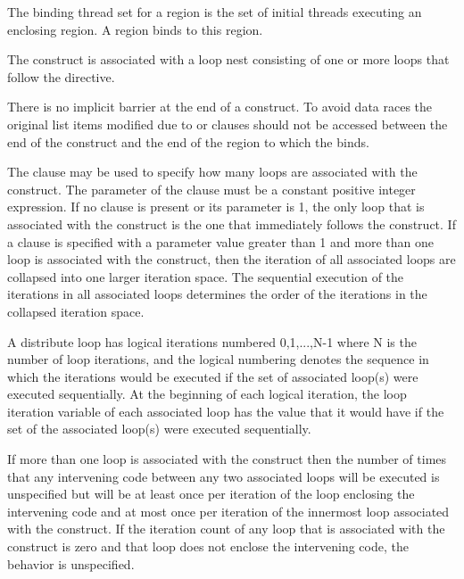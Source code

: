 \begin{samepage}

\binding
The binding thread set for a  region is the set of initial
threads executing an enclosing  region. A  region
binds to this  region.

\descr
The  construct is associated with a loop nest consisting of 
one or more loops that follow the directive.

There is no implicit barrier at the end of a  construct.
To avoid data races the original list items modified due to  
or  clauses should not be accessed between the end of the 
 construct and the end of the  region to which 
the  binds.

\end{samepage}

The  clause may be used to specify how many loops are
associated with the  construct.  The parameter of the
 clause must be a constant positive integer expression.
If no  clause is present or its parameter is 1, the
only loop that is associated with the  construct is
the one that immediately follows the  construct.  If
a  clause is specified with a parameter value greater
than 1 and more than one loop is associated with the 
construct, then the iteration of all associated loops are collapsed
into one larger iteration space.  The sequential execution of the
iterations in all associated loops determines the order of the
iterations in the collapsed iteration space.

A distribute loop has logical iterations numbered 0,1,...,N-1 where N
is the number of loop iterations, and the logical numbering denotes
the sequence in which the iterations would be executed if the set of
associated loop(s) were executed sequentially.  At the beginning of
each logical iteration, the loop iteration variable of each associated
loop has the value that it would have if the set of the associated
loop(s) were executed sequentially.

If more than one loop is associated with the 
construct then the number of times that any intervening code between
any two associated loops will be executed is unspecified but will be
at least once per iteration of the loop enclosing the intervening code
and at most once per iteration of the innermost loop associated with
the construct.  If the iteration count of any loop that is associated 
with the  construct is zero and that loop does not 
enclose the intervening code, the behavior is unspecified.

